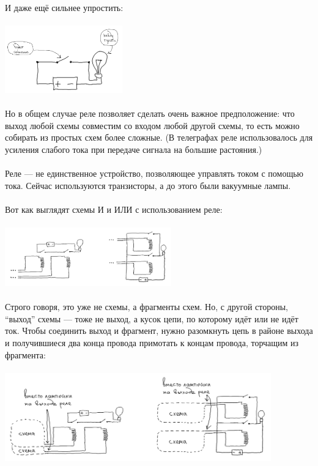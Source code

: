 \documentclass[11pt]{book}
\begin{document}
\\ \\
И даже ещё сильнее упростить:
\\ \\
\includegraphics[width=2in]{pic/14.png}
\\ \\
Но в общем случае реле позволяет сделать очень важное предположение:
что выход любой схемы совместим со входом любой другой схемы,
то есть можно собирать из простых схем более сложные.
(В телеграфах реле использовалось для усиления слабого тока при передаче сигнала на большие растояния.)
\\ \\
Реле --- не единственное устройство, позволяющее управлять током с помощью тока.
Сейчас используются транзисторы, а до этого были вакуумные лампы.
\\ \\
Вот как выглядят схемы И и ИЛИ с использованием реле:
\\ \\
\includegraphics[height=1in]{pic/15.png}
\\ \\
Строго говоря, это уже не схемы, а фрагменты схем. Но, с другой стороны, ``выход'' схемы ---
тоже не выход, а кусок цепи, по которому идёт или не идёт ток. Чтобы соединить выход
и фрагмент, нужно разомкнуть цепь в районе выхода и получившиеся два конца провода примотать
к концам провода, торчащим из фрагмента:
\\ \\
\includegraphics[height=1.5in]{pic/16.png}
\end{document}
